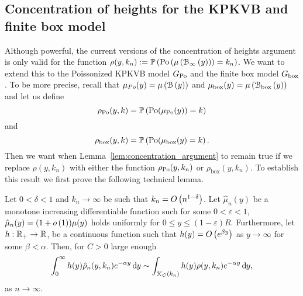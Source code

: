 \begin{appendices}
%
%
%

\subsection{Concentration of heights for the KPKVB and finite box model}\label{ssec:general_concentration_lemma}

Although powerful, the current versions of the concentration of heights argument is only valid for the function $\rho(y,k_n) := \mathbb{P}\left({\mathrm{Po}}\left(\mu\left({\mathcal B}_{\infty}\left(y\right)\right)\right) = k_n\right)$. We want to extend this to the Poissonized KPKVB model $G_{{\mathrm{Po}}}$ and the finite box model $G_{\mathrm{box}}$. To be more precise, recall that $\mu_{Po}(y) = \mu\left({\mathcal B}\left(y\right)\right)$ and $\mu_{\mathrm{box}}(y) = \mu\left({\mathcal B}_{\text{box}}\left(y\right)\right)$ and let us define
\[
	\rho_{{\mathrm{Po}}}(y,k) = \mathbb{P}\left({\mathrm{Po}}(\mu_{{\mathrm{Po}}}(y)) = k\right)
\] 
and
\[
	\rho_{\mathrm{box}}(y,k) = \mathbb{P}\left({\mathrm{Po}}(\mu_{\mathrm{box}}(y) = k\right).
\] 
Then we want when Lemma~\ref{lem:concentration_argument} to remain true if we replace $\rho(y,k_n)$ with either the function $\rho_{{\mathrm{Po}}}(y,k_n)$ or $\rho_{\text{box}}(y,k_n)$. To establish this result we first prove the following technical lemma.

\begin{lemma}\label{lem:concentration_heights_mu_approx}
Let $0 < \delta < 1$ and $k_n \to \infty$ be such that $k_n = O\left(n^{1-\delta}\right)$. Let $\hat{\mu}_n(y)$ be a monotone increasing differentiable function such for some $0 < \varepsilon < 1$, $\hat{\mu}_n(y) = (1+o\left(1\right))\mu(y)$ holds uniformly for $0 \le y \le (1-\varepsilon)R$. Furthermore, let $h : {\mathbb R}_+ \rightarrow  {\ensuremath{\mathbb R}}$, be a continuous function such that $h(y) = O\left(e^{\beta y}\right)$ as $y \to \infty$ for some $\beta < \alpha$. Then, for $C > 0$ large enough
\[
	\int_0^\infty h(y) \hat{\rho}_n(y,k_n) e^{-\alpha y} \operatorname{\mathrm{d}\hspace{-2pt}} y \sim  
		\int_{{\mathcal K}_C(k_n)} h(y) \rho(y,k_n) e^{-\alpha y} \operatorname{\mathrm{d}\hspace{-2pt}} y,
\]
as $n \to \infty$.
\end{lemma}


\end{appendices}
